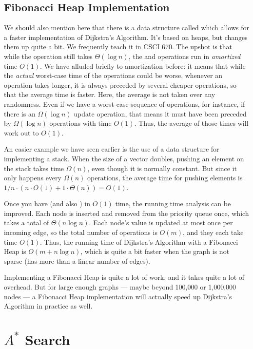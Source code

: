 \subsection{Fibonacci Heap Implementation}
We should also mention here that there is a data structure called
 which allows for a faster implementation of
Dijkstra's Algorithm. It's based on heaps, but changes them up quite a
bit. We frequently teach it in CSCI 670. The upshot is that while the
 operation still takes $\Theta(\log n)$, the
 and  operations run in \emph{amortized}
time $O(1)$. We have alluded briefly to amortization before: it means
that while the \emph{actual} worst-case time of the operations could
be worse, whenever an operation takes longer, it is always preceded by
several cheaper operations, so that the average time is faster.
Here, the average is not taken over any randomness. 
Even if we have a worst-case sequence of operations, for instance, if
there is an $\Omega(\log n)$ update operation, that means it must have
been preceded by $\Omega(\log n)$ operations with time $O(1)$. Thus,
the average of those times will work out to $O(1)$.

An easier example we have seen earlier is the use of a 
data structure for implementing a stack. 
When the size of a vector doubles, pushing an element on the stack
takes time $\Omega(n)$, even though it is normally constant. 
But since it only happens every $\Omega(n)$ operations, the
average time for pushing elements is 
$1/n \cdot (n \cdot O(1) + 1 \cdot \Theta(n)) = O(1)$.

Once you have  (and also ) in $O(1)$ time,
the running time analysis can be improved. Each node is inserted and
removed from the priority queue once, which takes a total of $\Theta(n
\log n)$. Each node's value is updated at most once per incoming edge,
so the total number of  operations is $O(m)$, and they
each take time $O(1)$. Thus, the running time of Dijkstra's Algorithm
with a Fibonacci Heap is $O(m + n \log n)$, which is quite a bit
faster when the graph is not sparse (has more than a linear number of
edges). 

Implementing a Fibonacci Heap is quite a lot of work, and it takes
quite a lot of overhead. But for large enough graphs --- maybe beyond
100,000 or 1,000,000 nodes --- a Fibonacci Heap implementation will
actually speed up Dijkstra's Algorithm in practice as well.

\section{$A^*$ Search}

